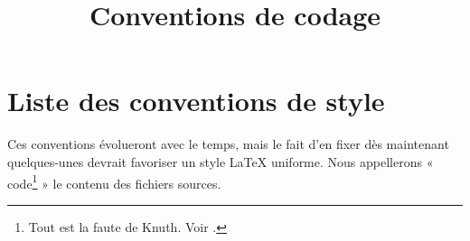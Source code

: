 

%


\title{Conventions de codage}


\maketitle

\label{section-phantom}

\tableofcontents

\section{Liste des conventions de style}
\label{section-style}

\noindent
Ces conventions évolueront avec le temps, mais le fait d'en fixer dès
maintenant quelques-unes devrait favoriser un style LaTeX uniforme.
Nous appellerons « code\footnote{Tout est la faute de Knuth. Voir
\cite{Knuth}.} » le contenu des fichiers sources.

